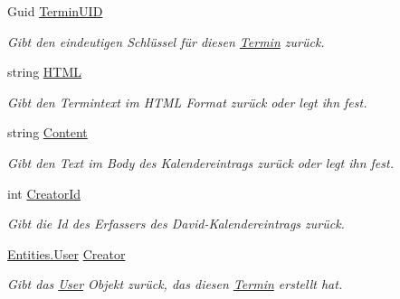 \begin{DoxyCompactItemize}
Guid \hyperlink{class_products_1_1_model_1_1_entities_1_1_termin_a0543b47f7fa008e2116c5ec447263834}{Termin\+U\+ID}
\begin{DoxyCompactList}\small\item\em Gibt den eindeutigen Schlüssel für diesen \hyperlink{class_products_1_1_model_1_1_entities_1_1_termin}{Termin} zurück. \end{DoxyCompactList}\item 
string \hyperlink{class_products_1_1_model_1_1_entities_1_1_termin_afb7e4093c42341a287616b176d7aa563}{H\+T\+ML}
\begin{DoxyCompactList}\small\item\em Gibt den Termintext im H\+T\+ML Format zurück oder legt ihn fest. \end{DoxyCompactList}\item 
string \hyperlink{class_products_1_1_model_1_1_entities_1_1_termin_a88d530fc21e906fcccf4e75502a49420}{Content}
\begin{DoxyCompactList}\small\item\em Gibt den Text im Body des Kalendereintrags zurück oder legt ihn fest. \end{DoxyCompactList}\item 
int \hyperlink{class_products_1_1_model_1_1_entities_1_1_termin_a3d97467e2a1092bf0ba195e4c0b6d53c}{Creator\+Id}
\begin{DoxyCompactList}\small\item\em Gibt die Id des Erfassers des David-\/\+Kalendereintrags zurück. \end{DoxyCompactList}\item 
\hyperlink{class_products_1_1_model_1_1_entities_1_1_user}{Entities.\+User} \hyperlink{class_products_1_1_model_1_1_entities_1_1_termin_a1a628398d9d647b8c794d041e00a851c}{Creator}
\begin{DoxyCompactList}\small\item\em Gibt das \hyperlink{class_products_1_1_model_1_1_entities_1_1_user}{User} Objekt zurück, das diesen \hyperlink{class_products_1_1_model_1_1_entities_1_1_termin}{Termin} erstellt hat. \end{DoxyCompactList}\item 

\end{DoxyCompactItemize}
